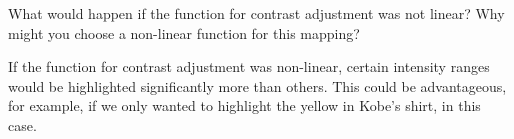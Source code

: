 What would happen if the function for contrast adjustment was not linear? Why might you choose a non-linear function for this mapping?

\begin{solution}
    If the function for contrast adjustment was non-linear, certain intensity ranges would be highlighted significantly more than others. This could be advantageous, for example, if we only wanted to highlight the yellow in Kobe's shirt, in this case.
\end{solution}
